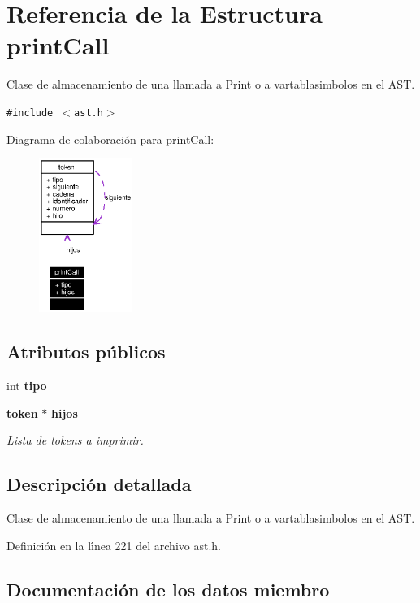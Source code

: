 \section{Referencia de la Estructura print\-Call}
\label{structprintCall}
Clase de almacenamiento de una llamada a Print o a vartablasimbolos en el AST.  


{\tt \#include $<$ast.h$>$}

Diagrama de colaboraci\'{o}n para print\-Call:\begin{figure}[H]
\begin{center}
\leavevmode
\includegraphics[width=86pt]{structprintCall__coll__graph}
\end{center}
\end{figure}
\subsection*{Atributos p\'{u}blicos}
\begin{CompactItemize}
\item 
int {\bf tipo}
\item 
{\bf token} $\ast$ {\bf hijos}
\begin{CompactList}\small\item\em Lista de tokens a imprimir. \item\end{CompactList}\end{CompactItemize}


\subsection{Descripci\'{o}n detallada}
Clase de almacenamiento de una llamada a Print o a vartablasimbolos en el AST. 



Definici\'{o}n en la l\'{\i}nea 221 del archivo ast.h.

\subsection{Documentaci\'{o}n de los datos miembro}
